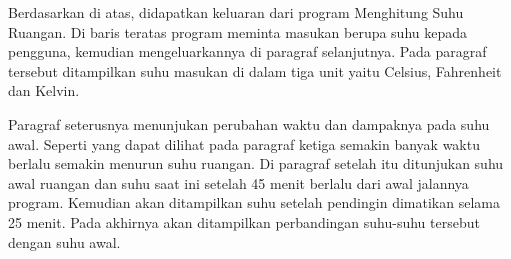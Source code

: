 \documentclass[../main.tex]{subfiles}
\begin{document}
\begin{indentpar}
    \hspace{\parindent}Berdasarkan  di atas, didapatkan keluaran dari program Menghitung Suhu Ruangan. Di baris teratas program meminta masukan berupa suhu kepada pengguna, kemudian mengeluarkannya di paragraf selanjutnya. Pada paragraf tersebut ditampilkan suhu masukan di dalam tiga unit yaitu Celsius, Fahrenheit dan Kelvin.

    Paragraf seterusnya menunjukan perubahan waktu dan dampaknya pada suhu awal. Seperti yang dapat dilihat pada paragraf ketiga semakin banyak waktu berlalu semakin menurun suhu ruangan. Di paragraf setelah itu ditunjukan suhu awal ruangan dan suhu saat ini setelah 45 menit berlalu dari awal jalannya program. Kemudian akan ditampilkan suhu setelah pendingin dimatikan selama 25 menit. Pada akhirnya akan ditampilkan perbandingan suhu-suhu tersebut dengan suhu awal.
\end{indentpar}
\end{document}
